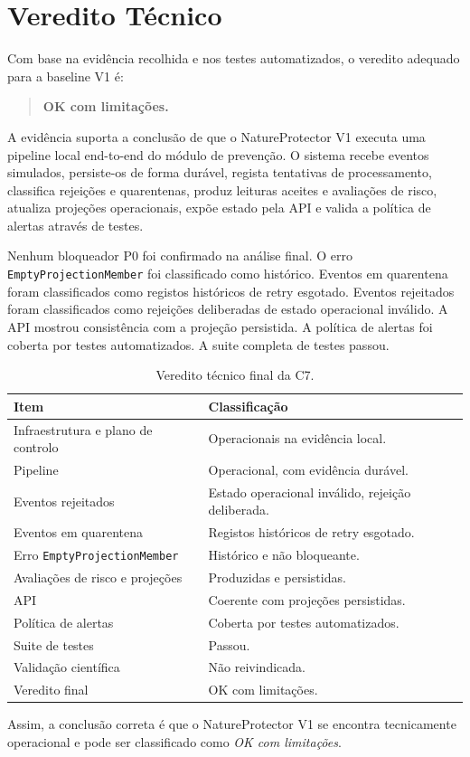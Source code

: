 \section{Veredito Técnico}

Com base na evidência recolhida e nos testes automatizados, o veredito adequado para a baseline V1 é:

\begin{quote}
\textbf{OK com limitações.}
\end{quote}

A evidência suporta a conclusão de que o NatureProtector V1 executa uma pipeline local end-to-end do módulo de prevenção. O sistema recebe eventos simulados, persiste-os de forma durável, regista tentativas de processamento, classifica rejeições e quarentenas, produz leituras aceites e avaliações de risco, atualiza projeções operacionais, expõe estado pela API e valida a política de alertas através de testes.

Nenhum bloqueador P0 foi confirmado na análise final. O erro \texttt{EmptyProjectionMember} foi classificado como histórico. Eventos em quarentena foram classificados como registos históricos de retry esgotado. Eventos rejeitados foram classificados como rejeições deliberadas de estado operacional inválido. A API mostrou consistência com a projeção persistida. A política de alertas foi coberta por testes automatizados. A suite completa de testes passou.

\begin{table}[h]
\centering
\caption{Veredito técnico final da C7.}
\label{tab:technical-verdict}
\begin{tabular}{p{} p{}}
\hline
\textbf{Item} & \textbf{Classificação} \\
\hline
Infraestrutura e plano de controlo & Operacionais na evidência local. \\
Pipeline & Operacional, com evidência durável. \\
Eventos rejeitados & Estado operacional inválido, rejeição deliberada. \\
Eventos em quarentena & Registos históricos de retry esgotado. \\
Erro \texttt{EmptyProjectionMember} & Histórico e não bloqueante. \\
Avaliações de risco e projeções & Produzidas e persistidas. \\
API & Coerente com projeções persistidas. \\
Política de alertas & Coberta por testes automatizados. \\
Suite de testes & Passou. \\
Validação científica & Não reivindicada. \\
Veredito final & OK com limitações. \\
\hline
\end{tabular}
\end{table}
Assim, a conclusão correta é que o NatureProtector V1 se encontra tecnicamente operacional e pode ser classificado como \textit{OK com limitações}.